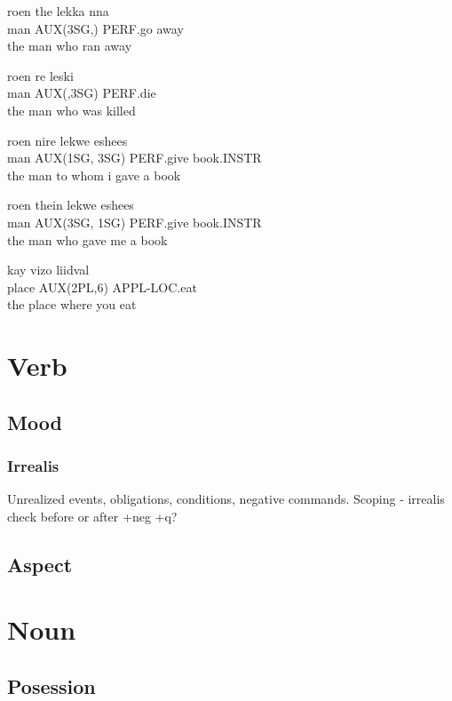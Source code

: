 \documentclass[11pt]{book}
\begin{document}
\begin{exe}
\ex
\gll roen the lekka nna \\
 man AUX(3SG,) PERF.go away \\
\trans the man who ran away

\ex
\gll roen re leski \\
man AUX(,3SG) PERF.die \\
\trans the man who was killed


\ex
\gll roen nire lekwe eshees \\
man AUX(1SG, 3SG) PERF.give book.INSTR \\
\trans the man to whom i gave a book

\ex
\gll roen thein lekwe eshees \\
man AUX(3SG, 1SG) PERF.give book.INSTR \\
\trans the man who gave me a book

\ex
\gll kay vizo liidval \\
place AUX(2PL,6) APPL-LOC.eat \\
\trans the place where you eat
\end{exe}



\chapter{Verb}

\section{Mood}
\subsection{Irrealis}
Unrealized events, obligations, conditions, negative commands. Scoping - irrealis check before or after +neg +q?

\section{Aspect}




\chapter{Noun}
\section{Posession}
\end{document}
